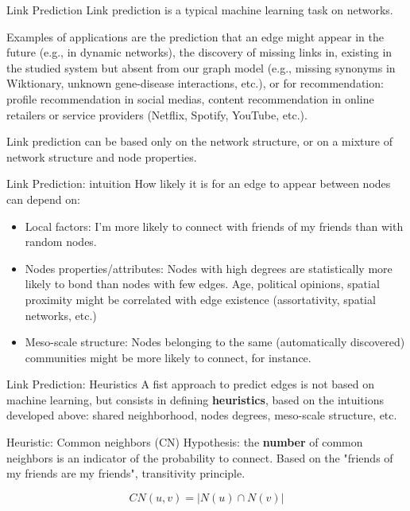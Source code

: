 \documentclass[a4paper,11pt]{book}
\begin{document}
\begin{textbox}{Link Prediction}
Link prediction is a typical machine learning task on networks.

Examples of applications are the prediction that an edge might appear in the future (e.g., in dynamic networks), the discovery of missing links in, existing in the studied system but absent from our graph model (e.g., missing synonyms in Wiktionary, unknown gene-disease interactions, etc.), or for recommendation: profile recommendation in social medias, content recommendation in online retailers or service providers (Netflix, Spotify, YouTube, etc.).

Link prediction can be based only on the network structure, or on a mixture of network structure and node properties.  
\end{textbox}



\begin{textbox}{Link Prediction: intuition}
How likely it is for an edge to appear between nodes can depend on:
\begin{itemize}
    \item Local factors: I'm more likely to connect with friends of my friends than with random nodes.
    \item Nodes properties/attributes: Nodes with high degrees are statistically more likely to bond than nodes with few edges. Age, political opinions, spatial proximity might be correlated with edge existence (assortativity, spatial networks, etc.)
    \item Meso-scale structure: Nodes belonging to the same (automatically discovered) communities might be more likely to connect, for instance.
\end{itemize}
\end{textbox}





\begin{textbox}{Link Prediction: Heuristics}
A fist approach to predict edges is not based on machine learning, but consists in defining  \textbf{heuristics}, based on the intuitions developed above: shared neighborhood, nodes degrees, meso-scale structure, etc.
\end{textbox}

\begin{textbox}{Heuristic: Common neighbors (CN)}
Hypothesis: the \textbf{number} of common neighbors is an indicator of the probability to connect. Based on the "friends of my friends are my friends", transitivity principle.

\[
CN(u,v)=|N(u)\cap N(v)|
\]

\end{textbox}
\end{document}
